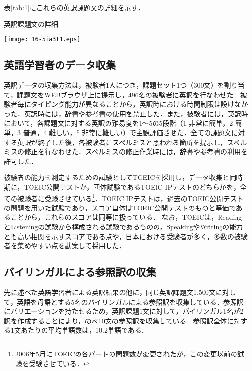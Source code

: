 \documentclass[japanese]{jnlp_1.4}
\begin{document}
表\ref{tab:1}にこれらの英訳課題文の詳細を示す．

\begin{table}[t]
\caption{英訳課題文の詳細}
\begin{center}
\texttt{[image: 16-5ia3t1.eps]}
\end{center}
\label{tab:1}
\end{table}


\subsection{英語学習者のデータ収集}\label{subsec:data}

英訳データの収集方法は，被験者1人につき，課題セット1つ（300文）を割り当て，課題文をWEBブラウザ上に提示し，496名の被験者に英訳を行なわせた．被験者毎にタイピング能力が異なることから，英訳時における時間制限は設けなかった．英訳時には，辞書や参考書の使用を禁止した．また，被験者には，英訳時において，各課題文に対する英訳の難易度を1〜5の5段階（1 非常に簡単，2 簡単，3 普通，4 難しい，5 非常に難しい）で主観評価させた．全ての課題文に対する英訳が終了した後，各被験者にスペルミスと思われる箇所を提示し，スペルミスの修正を行なわせた．スペルミスの修正作業時には，辞書や参考書の利用を許可した．

被験者の能力を測定するための試験としてTOEICを採用し，データ収集と同時期に，TOEIC公開テストか，団体試験であるTOEIC IPテストのどちらかを，全ての被験者に受験させている\footnote{2006年5月にTOEICの各パートの問題数が変更されたが，この変更以前の試験を受験させている．}．TOEIC IPテストは，過去のTOEIC公開テストの問題を用いた試験であり，スコア自体はTOEIC公開テストのものと等価であることから，これらのスコアは同等に扱っている．
なお，TOEICは，ReadingとListeningの試験から構成される試験であるものの，SpeakingやWritingの能力とも高い相関を示すスコアである点\cite{toeic2}や，日本における受験者が多く，多数の被験者を集めやすい点を勘案して採用した．

\subsection{バイリンガルによる参照訳の収集}\label{ref}

先に述べた英語学習者による英訳結果の他に，同じ英訳課題文1,500文に対して，英語を母語とする5名のバイリンガルによる参照訳を収集している．参照訳にバリエーションを持たせるため，英訳課題1文に対して，バイリンガル1名が2訳を作成することにより，のべ10文の参照訳を収集している．参照訳全体に対する1文あたりの平均単語数は，10.2単語である．
\end{document}
